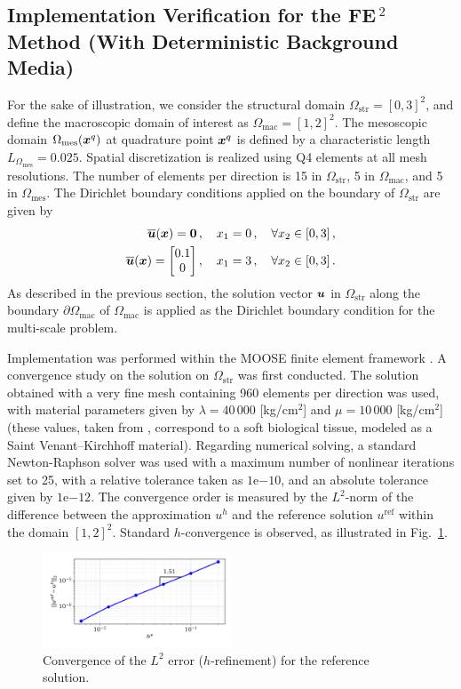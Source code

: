 \subsection{Implementation Verification for the FE\,$^2$ Method (With Deterministic Background Media)}
For the sake of illustration, we consider the structural domain $\Omega_{\text{str}} = [0, 3]^2$, and define the macroscopic domain of interest as $\Omega_{\text{mac}} = [1, 2]^2$. The mesoscopic domain $\Omega_{\text{mes}}({\boldsymbol{x}}^{q})$ at quadrature point ${\boldsymbol{x}}^{q}$ is defined by a characteristic length $L_{\Omega_{\text{mes}}} = 0.025$. Spatial discretization is realized using Q4 elements at all mesh resolutions. The number of elements per direction is 15 in $\Omega_\text{str}$, 5 in $\Omega_\text{mac}$, and 5 in $\Omega_{\text{mes}}$. The Dirichlet boundary conditions applied on the boundary of $\Omega_{\text{str}}$ are given by
\begin{align}
    \overline{{\boldsymbol{u}}}({\boldsymbol{x}}) = \mathbf{0}\,, \quad x_1 = 0\,, \quad \forall x_2 \in [0,3]\,,\\
    \overline{{\boldsymbol{u}}}({\boldsymbol{x}}) = \begin{bmatrix}
        0.1 \\ 0 \end{bmatrix}, \quad x_1 = 3\,, \quad \forall x_2 \in [0,3]\,.
\end{align}
As described in the previous section, the solution vector ${\boldsymbol{u}}$ in $\Omega_\text{str}$ along the boundary $\partial \Omega_\text{mac}$ of $\Omega_\text{mac}$ is applied as the Dirichlet boundary condition for the multi-scale problem. 

Implementation was performed within the MOOSE finite element framework \cite{permann2020moose}. A convergence study on the solution on $\Omega_\text{str}$ was first conducted. The solution obtained with a very fine mesh containing 960 elements per direction was used, with material parameters given by $\lambda = 40\,000$ [kg/cm$^2$] and $\mu = 10\,000$ [kg/cm$^2$] (these values, taken from \cite{picinbono2003non}, correspond to a soft biological tissue, modeled as a Saint Venant–Kirchhoff material). Regarding numerical solving, a standard Newton-Raphson solver was used with a maximum number of nonlinear iterations set to 25, with a relative tolerance taken as $1\mathrm{e}{-10}$, and an absolute tolerance given by $1\mathrm{e}{-12}$. The convergence order is measured by the $L^2$-norm of the difference between the approximation $u^h$ and the reference solution $u^{\text{ref}}$ within the domain $[1, 2]^2$. Standard $h$-convergence is observed, as illustrated in Fig.~\ref{fig:convergence}.
\begin{figure}[!ht]
    \centering
    \includegraphics[width = 0.5\textwidth]{Pictures/convergence.png}
    \caption{Convergence of the $L^2$ error ($h$-refinement) for the reference solution.}
    \label{fig:convergence}
\end{figure}

